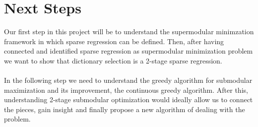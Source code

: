 \documentclass{article}
\begin{document}
\section{Next Steps} \label{next steps}
Our first step in this project will be to understand the supermodular minimzation framework in which sparse regression can be defined. Then, after having connected and identified sparse regression as supermodular minimization problem we want to show that dictionary selection is a 2-stage sparse regression. \\
\\
In the following step we need to understand the greedy algorithm for submodular maximization and its improvement, the continuous greedy algorithm. After this, understanding 2-stage submodular optimization would ideally allow us to connect the pieces, gain insight and finally propose a new algorithm of dealing with the problem.

%


\end{document}
